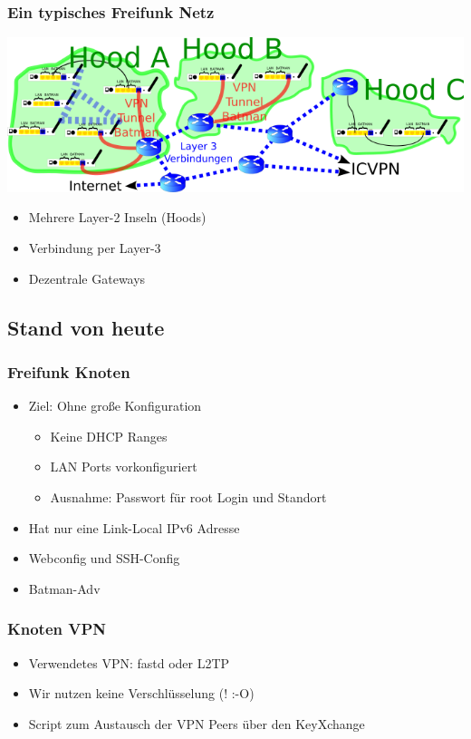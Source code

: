 \begin{frame}
\frametitle{Ein typisches Freifunk Netz}
    \includegraphics[width=\textwidth]{images/freifunk_konzepte.png}

    \begin{itemize}
        \item Mehrere Layer-2 Inseln (Hoods)
        \item Verbindung per Layer-3
        \item Dezentrale Gateways
    \end{itemize}
\end{frame}




\subsection{Stand von heute}

\begin{frame}
\frametitle{Freifunk Knoten}
    \begin{itemize}
        \item Ziel: Ohne große Konfiguration
        \begin{itemize}
            \item Keine DHCP Ranges
            \item LAN Ports vorkonfiguriert
            \item Ausnahme: Passwort für root Login und Standort
        \end{itemize}
        \item Hat nur eine Link-Local IPv6 Adresse
        \item Webconfig und SSH-Config
        \item Batman-Adv
    \end{itemize}
\end{frame}

\begin{frame}
\frametitle{Knoten VPN}
    \begin{itemize}
        \item Verwendetes VPN: fastd oder L2TP
        \item Wir nutzen keine Verschlüsselung (! :-O)
        \item Script zum Austausch der VPN Peers über den KeyXchange
    \end{itemize}
\end{frame}


